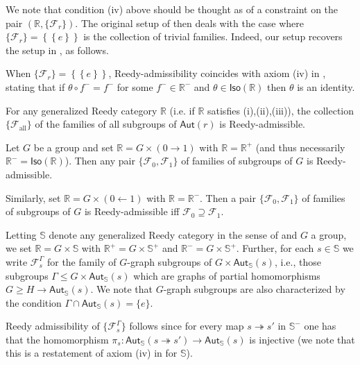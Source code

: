 \documentclass[a4paper,10pt
 ,draft
]{article}%
\begin{document}
We note that condition (iv) above should be thought as of a constraint on the pair 
$(\mathbb{R},\{\mathcal{F}_r\})$.
The original setup of \cite{BM11} then deals with the case
where $\{ \mathcal{F}_r \} =
 \left\{ \left\{ e \right\} \right\}$
is the collection of trivial families. Indeed, our setup recovers
the setup in \cite{BM11}, as follows.

\begin{example}
	When $\{ \mathcal{F}_r \} =
 \left\{ \left\{ e \right\} \right\}$, Reedy-admissibility coincides with axiom (iv) in \cite[Def. 1.1]{BM11},
stating that if $\theta \circ f^{-} = f^{-}$
for some $f^- \in \mathbb{R}^{-}$ and 
$\theta \in \mathsf{Iso}(\mathbb{R})$ then $\theta$ is an identity.
\end{example}

\begin{example}
For any generalized Reedy category $\mathbb{R}$
(i.e. if $\mathbb{R}$ satisfies (i),(ii),(iii)),
the collection $\{\mathcal{F}_{\text{all}}\}$
of the families of all subgroups of $\mathsf{Aut}(r)$
is Reedy-admissible.
\end{example}

\begin{example}
	Let $G$ be a group and set $\mathbb{R} = G \times (0 \to 1)$ with $\mathbb{R} = \mathbb{R}^+$
	(and thus necessarily $\mathbb{R}^- = \mathsf{Iso}(\mathbb{R})$).
	Then any pair 
	$\{\mathcal{F}_0,\mathcal{F}_1\}$
	of families of subgroups of $G$ is Reedy-admissible.
	
	Similarly, set $\mathbb{R} = G \times (0 \leftarrow 1)$
	with $\mathbb{R} = \mathbb{R}^-$. Then a pair
	$\{\mathcal{F}_0,\mathcal{F}_1\}$
	of families of subgroups of $G$ is Reedy-admissible
	iff $\mathcal{F}_0 \supseteq \mathcal{F}_1$.
\end{example}


\begin{example}\label{GGRAPHREEDY EX}
	Letting $\mathbb{S}$ denote any generalized Reedy category in the sense of \cite[Def. 1.1]{BM11} and $G$ a group,
	we set $\mathbb{R} = G \times \mathbb{S}$
	with $\mathbb{R}^+ = G \times \mathbb{S}^+$ and 
	$\mathbb{R}^- = G \times \mathbb{S}^+$.
	Further, for each $s \in \mathbb{S}$ we write
	$\mathcal{F}_s^{\Gamma}$ for the family of 
	$G$-graph subgroups of $G \times \mathsf{Aut}_{\mathbb{S}}(s)$, i.e., those subgroups 
	$\Gamma \leq G \times \mathsf{Aut}_{\mathbb{S}}(s)$ 
	which are graphs of partial homomorphisms
	$G \geq H \to \mathsf{Aut}_{\mathbb{S}}(s)$. We note that $G$-graph subgroups are also characterized by the condition $\Gamma \cap \mathsf{Aut}_{\mathbb{S}}(s) = \{e\}$.
	
	Reedy admissibility of $\{\mathcal{F}_s^{\Gamma}\}$ follows since for every map 
	$s \twoheadrightarrow s'$ in $\mathbb{S}^-$ one has that the homomorphism
	$\pi_s \colon \mathsf{Aut}_{\mathbb{S}}(s \twoheadrightarrow s')
	\to \mathsf{Aut}_{\mathbb{S}}(s)$ is injective
	(we note that this is a restatement of axiom (iv) in \cite[Def. 1.1]{BM11} for $\mathbb{S}$).
\end{example}
\end{document}
